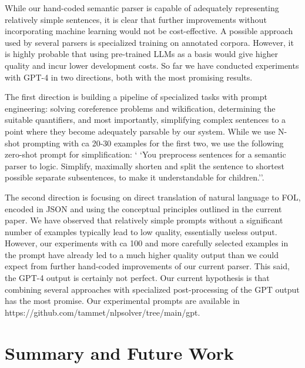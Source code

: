 \documentclass[runningheads]{llncs}
\begin{document}
While our hand-coded semantic parser is capable of adequately representing relatively
simple sentences, it is clear that further improvements without incorporating 
machine learning would not be cost-effective. A possible approach used by several
parsers is specialized training on annotated corpora. However, it is highly
probable that using pre-trained LLMs as a basis would give higher quality and incur lower
development costs. So far we have conducted experiments with GPT-4 in two directions, 
both with the most promising results.

The first direction is building a pipeline of specialized tasks with prompt engineering:
solving coreference problems and wikification, determining the suitable quantifiers, and
most importantly, simplifying complex sentences to a point where they become adequately
parsable by our system. While we use N-shot prompting with ca 20-30 examples for the
first two, we use the following zero-shot prompt for simplification: `
`You preprocess sentences for a semantic parser to logic. 
Simplify, maximally shorten and split the sentence to shortest possible separate subsentences, 
to make it understandable for children.''.

The second direction is focusing on direct translation of natural language to FOL, encoded
in JSON and using the conceptual principles outlined in the current paper. We have observed
that relatively simple prompts without a significant number of examples typically lead to 
low quality, essentially useless output. However, our experiments with ca 100 and more carefully
selected examples in the prompt have already led to a much higher quality output than we could expect from
further hand-coded improvements of our current parser. This said, the GPT-4 output is certainly 
not perfect. Our current hypothesis is that combining several approaches with specialized post-processing of
the GPT output has the most promise. Our experimental prompts are available in https://github.com/tammet/nlpsolver/tree/main/gpt.


\section{Summary and Future Work}
\end{document}
